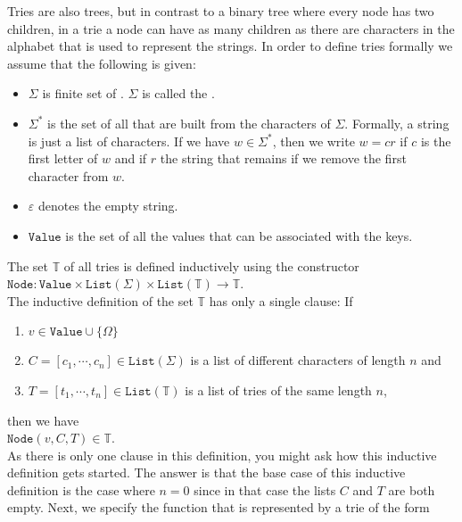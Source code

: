 Tries are also trees, but in contrast to a binary tree where every node has two children, in a trie a
node can have as many children as there are characters in the alphabet that is used to represent the
strings.  In order to define tries formally we assume that the following is given:
\begin{itemize}
\item $\Sigma$ is finite set of . $\Sigma$ is called the
      . 
\item $\Sigma^*$ is the set of all  that are built from the characters of $\Sigma$.
      Formally, a string is just a list of characters.  If we have $w \in \Sigma^*$, then we write $w = cr$
      if $c$ is the first letter of $w$ and if $r$ the string that remains if we remove the first
      character from $w$.
\item $\varepsilon$ denotes the empty string.
\item $\mathtt{Value}$ is the set of all the values that can be associated with the keys.  
\end{itemize}
The set $\mathbb{T}$ of all tries is defined inductively using the constructor \\[0.2cm]
\hspace*{1.3cm} 
$\mathtt{Node}: \mathtt{Value} \times \mathtt{List}(\Sigma) \times
\mathtt{List}(\mathbb{T}) \rightarrow \mathbb{T}$. 
\\[0.2cm]
The inductive definition of the set $\mathbb{T}$ has only a single clause: If
\begin{enumerate}
\item $v \in \mathtt{Value} \cup \{\Omega\}$
\item $C = [c_1, \cdots, c_n] \in \mathtt{List}(\Sigma)$ is a list of different characters of length
      $n$ and
\item $T = [t_1, \cdots, t_n] \in \mathtt{List}(\mathbb{T})$ is a list of  tries of the same length $n$, 
\end{enumerate}
then we have 
\\[0.2cm]
\hspace*{1.3cm}  $\mathtt{Node}(v, C, T) \in \mathbb{T}$.  
\\[0.2cm]
As there is only one clause in this definition, you might ask how this inductive definition gets started.
The answer is that the base case of this inductive definition is the case where
$n=0$ since in that case the lists  $C$ and $T$ are both empty.
Next, we specify the function that is represented by a trie of the form 
\\[0.2cm]
